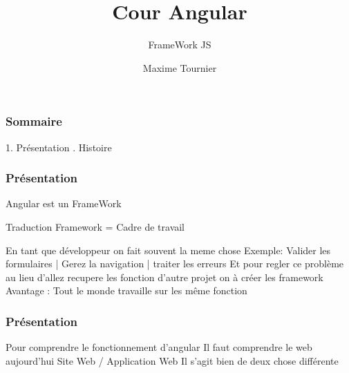 \documentclass[10pt]{beamer}
\title[Angular]
{Cour Angular}
\subtitle{FrameWork JS}
\author[Maxime Tournier]
{Maxime Tournier}
\date[21/08/2023]
\begin{document}
	\frame{\titlepage}
%
%
%
%
%

	\begin{frame}
		\frametitle{Sommaire}

		1. {Présentation} . {Histoire}

	\end{frame}

	\begin{frame}
		\frametitle{Présentation}
	
		Angular est un FrameWork

		\begin{block}{Traduction}
			Framework = Cadre de travail
		\end{block}

		En tant que développeur on fait souvent la meme chose \newline \newline
		Exemple: \newline Valider les formulaires | Gerez la navigation | traiter les erreurs
		\newline \newline
		Et pour regler ce problème au lieu d'allez recupere les fonction d'autre projet on à créer les framework
		\newline \newline
		Avantage : Tout le monde travaille sur les même fonction
		
	\end{frame}

	\begin{frame}
		\frametitle{Présentation}

		Pour comprendre le fonctionnement d'angular
		\newline \newline
		Il faut comprendre le web aujourd'hui
		\newline \newline
		Site Web / Application Web
		\newline \newline
		Il s'agit bien de deux chose différente

	\end{frame}
\end{document}
